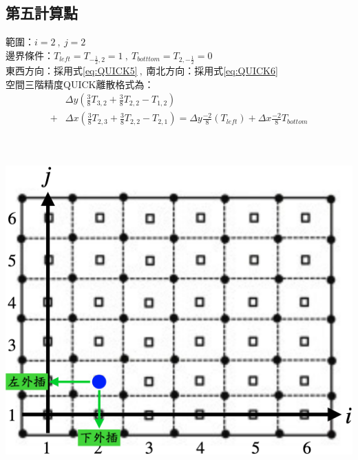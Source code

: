 \documentclass[12pt]{article}
\begin{document}
\subsection{第五計算點}
 \begin{minipage}{0.6\textwidth}
   \noindent 範圍：$i=2\ ,\ j=2$\\[1.5ex]
   \noindent 邊界條件：$T_{left} = T_{-\frac{1}{2},2}= 1\ ,\ T_{botttom} = T_{2,-\frac{1}{2}}= 0$\\[1.5ex]
   \noindent 東西方向：採用式\eqref{eq:QUICK5}$\ ,\ $南北方向：採用式\eqref{eq:QUICK6}\\[1.5ex]
   \noindent 空間三階精度QUICK離散格式為：
   \begin{equation*}\begin{split}
   &\Delta y(\frac{3}{8}T_{3,2} + \frac{3}{8}T_{2,2} -T_{1,2})\\[1.5ex] 
  +&\Delta x(\frac{3}{8}T_{2,3} + \frac{3}{8}T_{2,2} - T_{2,1}) =\Delta y \frac{-2}{8}(T_{left}) + \Delta x\frac{-2}{8}T_{bottom} \\[1.5ex]
   \end{split}\end{equation*}
   \end{minipage}                          
   \hfill
   \begin{minipage}{0.34\textwidth}
   \centering
   \includegraphics[width=\linewidth,height=9\baselineskip]{24.png}
   \label{fig:5th point}
\end{minipage}
\end{document}
